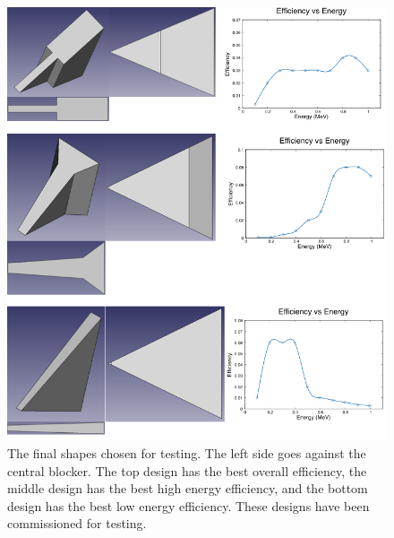 \begin{figure}
    \centering
    \includegraphics[scale=0.8]{Future_Figs/FinalShapes.png}  
    \caption{The final shapes chosen for testing. The left side goes against the central blocker. The top design has the best overall efficiency, the middle design has the best high energy efficiency, and the bottom design has the best low energy efficiency. These designs have been commissioned for testing.}
    \label{fig:finalshapes}
\end{figure}